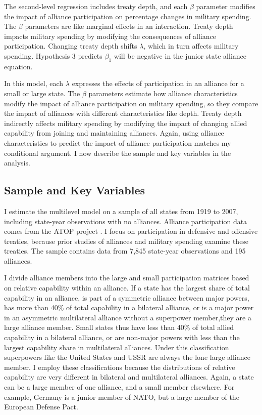 \documentclass[12pt]{article}
\begin{document}
The second-level regression includes treaty depth, and each $\beta$ parameter modifies the impact of alliance participation on percentage changes in military spending. 
The $\beta$ parameters are like marginal effects in an interaction. 
Treaty depth impacts military spending by modifying the consequences of alliance participation. 
Changing treaty depth shifts $\lambda$, which in turn affects military spending.
Hypothesis 3 predicts $\beta_1$ will be negative in the junior state alliance equation. 


In this model, each $\lambda$ expresses the effects of participation in an alliance for a small or large state.
The $\beta$ parameters estimate how alliance characteristics modify the impact of alliance participation on military spending, so they compare the impact of alliances with different characteristics like depth.
Treaty depth indirectly affects military spending by modifying the impact of changing allied capability from joining and maintaining alliances.  
Again, using alliance characteristics to predict the impact of alliance participation matches my conditional argument. 
I now describe the sample and key variables in the analysis.  



\subsection{Sample and Key Variables} 

I estimate the multilevel model on a sample of all states from 1919 to 2007, including state-year observations with no alliances. 
Alliance participation data comes from the ATOP project \citep{Leedsetal2002}.  
I focus on participation in defensive and offensive treaties, because prior studies of alliances and military spending examine these treaties. 
The sample contains data from 7,845 state-year observations and 195 alliances. 


I divide alliance members into the large and small participation matrices based on relative capability within an alliance. 
If a state has the largest share of total capability in an alliance, is part of a symmetric alliance between major powers, has more than 40\% of total capability in a bilateral alliance, or is a major power in an asymmetric multilateral alliance without a superpower member,they are a large alliance member. 
Small states thus have less than 40\% of total allied capability in a bilateral alliance, or are non-major powers with less than the largest capability share in multilateral alliances. 
Under this classification superpowers like the United States and USSR are always the lone large alliance member. 
I employ these classifications because the distributions of relative capability are very different in bilateral and multilateral alliances. 
Again, a state can be a large member of one alliance, and a small member elsewhere. 
For example, Germany is a junior member of NATO, but a large member of the European Defense Pact.
\end{document}
